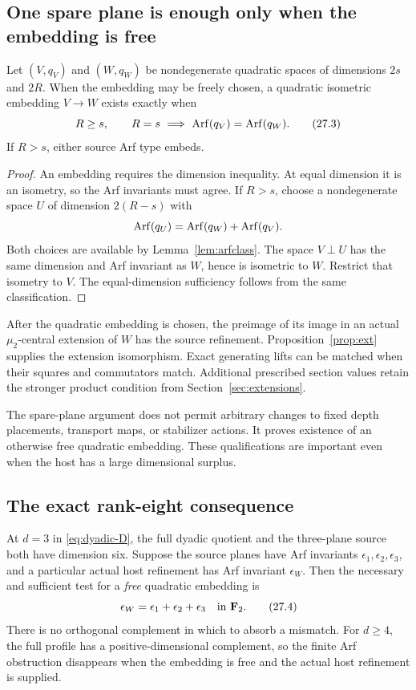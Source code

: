 \subsection{One spare plane is enough only when the embedding is free}
\begin{proposition}\label{prop:capacity}
Let $(V,q_V)$ and $(W,q_W)$ be nondegenerate quadratic spaces of dimensions $2s$ and $2R$. When the embedding may be freely chosen, a quadratic isometric embedding $V\to W$ exists exactly when
\[
 R\ge s,
 \qquad R=s\ \Longrightarrow\ \operatorname{Arf}(q_V)=\operatorname{Arf}(q_W).
 \tag{27.3}\label{eq:capcrit}
\]
If $R>s$, either source Arf type embeds.
\end{proposition}
\begin{proof}
An embedding requires the dimension inequality. At equal dimension it is an isometry, so the Arf invariants must agree. If $R>s$, choose a nondegenerate space $U$ of dimension $2(R-s)$ with
\[
 \operatorname{Arf}(q_U)=\operatorname{Arf}(q_W)+\operatorname{Arf}(q_V).
\]
Both choices are available by Lemma~\ref{lem:arfclass}. The space $V\perp U$ has the same dimension and Arf invariant as $W$, hence is isometric to $W$. Restrict that isometry to $V$. The equal-dimension sufficiency follows from the same classification.
\end{proof}

After the quadratic embedding is chosen, the preimage of its image in an actual $\mu_2$-central extension of $W$ has the source refinement. Proposition~\ref{prop:ext} supplies the extension isomorphism. Exact generating lifts can be matched when their squares and commutators match. Additional prescribed section values retain the stronger product condition from Section~\ref{sec:extensions}.

The spare-plane argument does not permit arbitrary changes to fixed depth placements, transport maps, or stabilizer actions. It proves existence of an otherwise free quadratic embedding. These qualifications are important even when the host has a large dimensional surplus.

\subsection{The exact rank-eight consequence}
At $d=3$ in \eqref{eq:dyadic-D}, the full dyadic quotient and the three-plane source both have dimension six. Suppose the source planes have Arf invariants $\epsilon_1,\epsilon_2,\epsilon_3$, and a particular actual host refinement has Arf invariant $\epsilon_W$. Then the necessary and sufficient test for a \emph{free} quadratic embedding is
\[
 \epsilon_W=\epsilon_1+\epsilon_2+\epsilon_3\quad\hbox{in }\mathbf F_2.
 \tag{27.4}\label{eq:rank8arf}
\]
There is no orthogonal complement in which to absorb a mismatch. For $d\ge4$, the full profile has a positive-dimensional complement, so the finite Arf obstruction disappears when the embedding is free and the actual host refinement is supplied.


